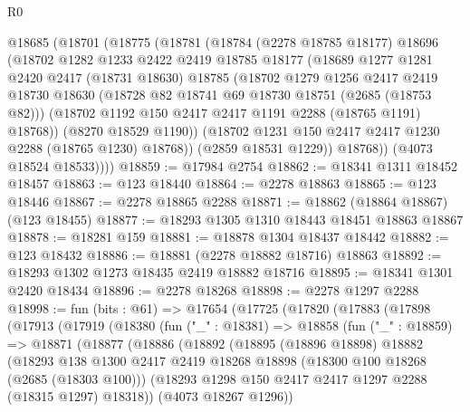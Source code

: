 \begin{lexlean}{R0}
\begin{coremodule}
      @18685
        (@18701
          (@18775
            (@18781
              (@18784
                (@2278 @18785 @18177)
                @18696
                (@18702
                  @1282
                  @1233
                  @2422
                  @2419
                  @18785
                  @18177
                  (@18689
                    @1277
                    @1281
                    @2420
                    @2417
                    (@18731 @18630)
                    @18785
                    (@18702
                      @1279
                      @1256
                      @2417
                      @2419
                      @18730
                      @18630
                      (@18728 @82 @18741 @69 @18730 @18751 (@2685 (@18753 @82)))
                      (@18702 @1192 @150 @2417 @2417 @1191 @2288 (@18765 @1191) @18768))
                    (@8270 @18529 @1190))
                  (@18702 @1231 @150 @2417 @2417 @1230 @2288 (@18765 @1230) @18768))
                (@2859 @18531 @1229))
              @18768))
          (@4073 @18524 @18533))))
@18859 := @17984 @2754
@18862 := @18341 @1311 @18452 @18457
@18863 := @123 @18440
@18864 := @2278 @18863
@18865 := @123 @18446
@18867 := @2278 @18865 @2288
@18871 := @18862 (@18864 @18867) (@123 @18455)
@18877 := @18293 @1305 @1310 @18443 @18451 @18863 @18867
@18878 := @18281 @159
@18881 := @18878 @1304 @18437 @18442
@18882 := @123 @18432
@18886 := @18881 (@2278 @18882 @18716) @18863
@18892 := @18293 @1302 @1273 @18435 @2419 @18882 @18716
@18895 := @18341 @1301 @2420 @18434
@18896 := @2278 @18268
@18898 := @2278 @1297 @2288
@18998 := fun (bits : @61) =>
  @17654
    (@17725
      (@17820
        (@17883
          (@17898
            (@17913
              (@17919
                (@18380
                  (fun ("_" : @18381) =>
                  @18858
                    (fun ("_" : @18859) =>
                    @18871
                      (@18877
                        (@18886
                          (@18892
                            (@18895
                              (@18896 @18898)
                              @18882
                              (@18293
                                @138
                                @1300
                                @2417
                                @2419
                                @18268
                                @18898
                                (@18300 @100 @18268 (@2685 (@18303 @100)))
                                (@18293 @1298 @150 @2417 @2417 @1297 @2288 (@18315 @1297) @18318))
                              (@4073 @18267 @1296))

\end{coremodule}
\end{lexlean}
